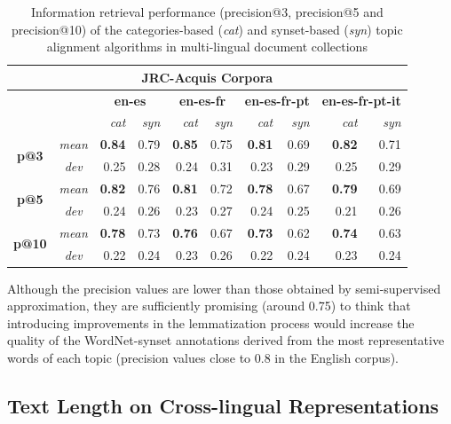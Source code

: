 \begin{table}[ht]\centering
\begin{center}
\small
\begin{tabular}{cc|rr||rr||rr||rr}
    \hline
    \multicolumn{10}{c}{\textbf{JRC-Acquis Corpora}} \\
    \hline
    & & \multicolumn{2}{c}{\textbf{en-es}} &
      \multicolumn{2}{c}{\textbf{en-es-fr}} &
      \multicolumn{2}{c}{\textbf{en-es-fr-pt}} &
      \multicolumn{2}{c}{\textbf{en-es-fr-pt-it}} \\
    & & {\textit{cat}} & {\textit{syn}} & {\textit{cat}} & {\textit{syn}} & {\textit{cat}} & {\textit{syn}} & {\textit{cat}} & {\textit{syn}} \\
    \hline
    \multirow{2}{*}{\textbf{p@3}} 
    &{\textit{mean}}    &\textbf{0.84} &0.79 &\textbf{0.85} &0.75 &\textbf{0.81} &0.69 &\textbf{0.82} &0.71\\
    &{\textit{dev}}     &0.25 &0.28 &0.24 &0.31 &0.23 &0.29 &0.25 &0.29\\
    \hline
    \multirow{2}{*}{\textbf{p@5}} 
    &{\textit{mean}}    &\textbf{0.82} &0.76 &\textbf{0.81} &0.72 &\textbf{0.78} &0.67 &\textbf{0.79} &0.69\\
    &{\textit{dev}}     &0.24 &0.26 &0.23 &0.27 &0.24 &0.25 &0.21 &0.26\\
    \hline
    \multirow{2}{*}{\textbf{p@10}} 
    &{\textit{mean}}    &\textbf{0.78} &0.73 &\textbf{0.76} &0.67 &\textbf{0.73} &0.62 &\textbf{0.74} &0.63\\
    &{\textit{dev}}     &0.22 &0.24 &0.23 &0.26 &0.22 &0.24 &0.23 &0.24\\
\end{tabular}
\end{center}
\caption{Information retrieval performance (precision@3, precision@5 and precision@10) of the categories-based (\textit{cat}) and synset-based (\textit{syn}) topic alignment algorithms in multi-lingual document collections}
\label{tb:multi-ir}
\end{table}

Although the precision values are lower than those obtained by semi-supervised approximation, they are sufficiently promising (around 0.75) to think that introducing improvements in the lemmatization process would increase the quality of the WordNet-synset annotations derived from the most representative words of each topic (precision values close to 0.8 in the English corpus).

\subsection{Text Length on Cross-lingual Representations}

